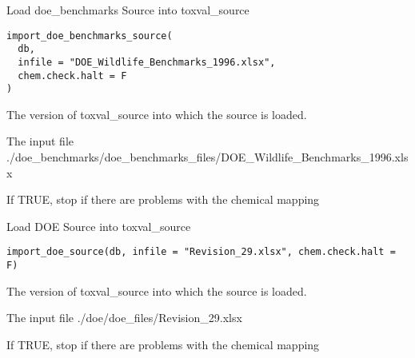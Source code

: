 \documentclass[letterpaper]{book}
\begin{document}
%
\begin{Description}\relax
Load doe\_benchmarks Source into toxval\_source
\end{Description}
%
\begin{Usage}
\begin{verbatim}
import_doe_benchmarks_source(
  db,
  infile = "DOE_Wildlife_Benchmarks_1996.xlsx",
  chem.check.halt = F
)
\end{verbatim}
\end{Usage}
%
\begin{Arguments}
\begin{ldescription}
\item[\code{db}] The version of toxval\_source into which the source is loaded.

\item[\code{infile}] The input file ./doe\_benchmarks/doe\_benchmarks\_files/DOE\_Wildlife\_Benchmarks\_1996.xlsx

\item[\code{chem.check.halt}] If TRUE, stop if there are problems with the chemical mapping
\end{ldescription}
\end{Arguments}
%
\begin{Description}\relax
Load DOE Source into toxval\_source
\end{Description}
%
\begin{Usage}
\begin{verbatim}
import_doe_source(db, infile = "Revision_29.xlsx", chem.check.halt = F)
\end{verbatim}
\end{Usage}
%
\begin{Arguments}
\begin{ldescription}
\item[\code{db}] The version of toxval\_source into which the source is loaded.

\item[\code{infile}] The input file ./doe/doe\_files/Revision\_29.xlsx

\item[\code{chem.check.halt}] If TRUE, stop if there are problems with the chemical mapping
\end{ldescription}
\end{Arguments}
\end{document}
